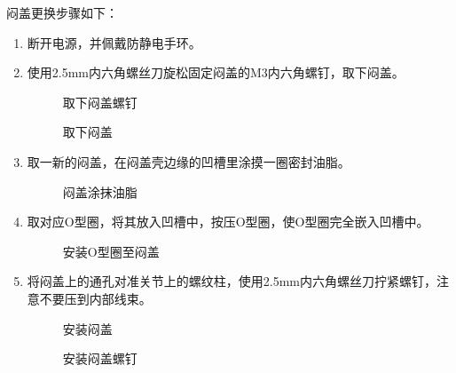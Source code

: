 \documentclass[a4paper,11pt,english,openany,oneside]{sphinxmanual}
\begin{document}
\sphinxAtStartPar
闷盖更换步骤如下：
\begin{enumerate}
%
\item {} 
\sphinxAtStartPar
断开电源，并佩戴防静电手环。

\item {} 
\sphinxAtStartPar
使用2.5mm内六角螺丝刀旋松固定闷盖的M3内六角螺钉，取下闷盖。

\begin{figure}[H]
\centering
\capstart

\noindent{}
\caption{取下闷盖螺钉}\label{\detokenize{_u66f4_u6362_u95f7_u76d6_uff0c_u73af_u5f62_u706f_u58f3:id6}}\end{figure}

\begin{figure}[H]
\centering
\capstart

\noindent{}
\caption{取下闷盖}\label{\detokenize{_u66f4_u6362_u95f7_u76d6_uff0c_u73af_u5f62_u706f_u58f3:id7}}\end{figure}

\item {} 
\sphinxAtStartPar
取一新的闷盖，在闷盖壳边缘的凹槽里涂摸一圈密封油脂。

\begin{figure}[H]
\centering
\capstart

\noindent{}
\caption{闷盖涂抹油脂}\label{\detokenize{_u66f4_u6362_u95f7_u76d6_uff0c_u73af_u5f62_u706f_u58f3:id8}}\end{figure}

\item {} 
\sphinxAtStartPar
取对应O型圈，将其放入凹槽中，按压O型圈，使O型圈完全嵌入凹槽中。

\begin{figure}[H]
\centering
\capstart

\noindent{}
\caption{安装O型圈至闷盖}\label{\detokenize{_u66f4_u6362_u95f7_u76d6_uff0c_u73af_u5f62_u706f_u58f3:id9}}\end{figure}

\item {} 
\sphinxAtStartPar
将闷盖上的通孔对准关节上的螺纹柱，使用2.5mm内六角螺丝刀拧紧螺钉，注意不要压到内部线束。

\begin{figure}[H]
\centering
\capstart

\noindent{}
\caption{安装闷盖}\label{\detokenize{_u66f4_u6362_u95f7_u76d6_uff0c_u73af_u5f62_u706f_u58f3:id10}}\end{figure}

\begin{figure}[H]
\centering
\capstart

\noindent{}
\caption{安装闷盖螺钉}\label{\detokenize{_u66f4_u6362_u95f7_u76d6_uff0c_u73af_u5f62_u706f_u58f3:id11}}\end{figure}

\end{enumerate}
\end{document}
